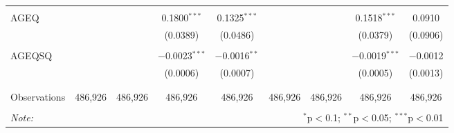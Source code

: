 \documentclass{article}
\begin{document}
\begin{sidewaystable}[!htbp]
\begin{tabular}{@{\extracolsep{5pt}}lcccccccc}
  & & & & & & & & \\ 
 AGEQ &  &  & 0.1800$^{***}$ & 0.1325$^{***}$ &  &  & 0.1518$^{***}$ & 0.0910 \\ 
  &  &  & (0.0389) & (0.0486) &  &  & (0.0379) & (0.0906) \\ 
  & & & & & & & & \\ 
 AGEQSQ &  &  & $-$0.0023$^{***}$ & $-$0.0016$^{**}$ &  &  & $-$0.0019$^{***}$ & $-$0.0012 \\ 
  &  &  & (0.0006) & (0.0007) &  &  & (0.0005) & (0.0013) \\ 
  & & & & & & & & \\ 
\hline \\[-1.8ex] 
Observations & 486,926 & 486,926 & 486,926 & 486,926 & 486,926 & 486,926 & 486,926 & 486,926 \\ 
\hline 
\hline \\[-1.8ex] 
\textit{Note:}  & \multicolumn{8}{r}{$^{*}$p$<$0.1; $^{**}$p$<$0.05; $^{***}$p$<$0.01} \\ 
\end{tabular} 
\end{sidewaystable} 
\end{document}
